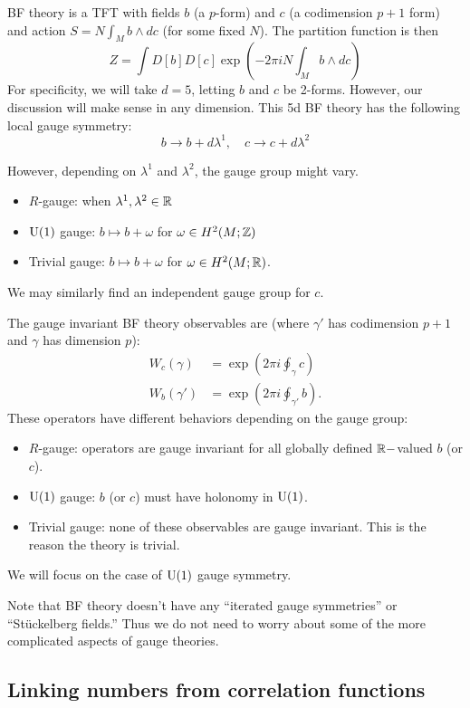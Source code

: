 BF theory is a TFT with fields $b$ (a $p$-form) and $c$ (a codimension $p+1$ form) and action $S = N \int_M b \wedge dc$ (for some fixed $N$).
The partition function is then
\[
	Z = \int D[b] D[c] \exp\left(-2\pi i N \int_M b \wedge dc \right)
\]
For specificity, we will take $d = 5$, letting $b$ and $c$ be 2-forms. However, our discussion will make sense in any dimension.
This 5d BF theory has the following local gauge symmetry:
\[
	b \to b + d\lambda^1, \quad c \to c + d \lambda^2
\]

However, depending on $\lambda^1$ and $\lambda^2$, the gauge group might vary.
\begin{itemize}
	\item $R$-gauge: when $\lambda^1, \lambda^2 \in \mathbb{R}$
	\item $\mathrm{U}(1)$ gauge: $b \mapsto b + \omega$ for $\omega \in H^2(M; \mathbb{Z})$
	\item Trivial gauge: $b \mapsto b + \omega$ for $\omega \in H^2(M; \mathbb{R})$.
\end{itemize}
We may similarly find an independent gauge group for $c$.

The gauge invariant BF theory observables are (where $\gamma'$ has codimension $p+1$ and $\gamma$ has dimension $p$):
\begin{align*}
	W_c(\gamma) &= \exp\left(2\pi i \oint_\gamma c\right) \\
	W_b(\gamma') &= \exp\left(2\pi i \oint_{\gamma'} b\right).
\end{align*}
These operators have different behaviors depending on the gauge group:
\begin{itemize}
	\item $R$-gauge: operators are gauge invariant for all globally defined $\mathbb{R}-$valued $b$ (or $c$).
	\item $\mathrm{U}(1)$ gauge: $b$ (or $c$) must have holonomy in $\mathrm{U}(1)$.
	\item Trivial gauge: none of these observables are gauge invariant. This is the reason the theory is trivial.
\end{itemize}
We will focus on the case of $\mathrm{U}(1)$ gauge symmetry.

Note that BF theory doesn't have any ``iterated gauge symmetries'' or ``St\"uckelberg fields.''
Thus we do not need to worry about some of the more complicated aspects of gauge theories.

\subsection{Linking numbers from correlation functions}

